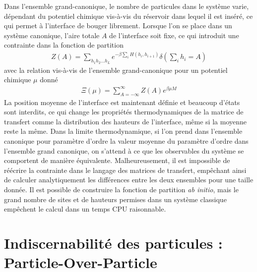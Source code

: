 Dans l'ensemble grand-canonique, le nombre de particules dans le système varie, dépendant du potentiel chimique vis-à-vis du réservoir dans lequel il est inséré, ce qui permet à l'interface de bouger librement. Lorsque l'on se place dans un système canonique, l'aire totale $A$ de l'interface soit fixe, ce qui introduit une contrainte dans la fonction de partition
\begin{align}
	 Z(A) = \sum_{h_1 h_2 ... h_L} e^{- \beta \sum_{i} H(h_i,h_{i+1})}  \delta(\sum_i h_i = A)
\end{align}
avec la relation vis-à-vis de l'ensemble grand-canonique pour un potentiel chimique $\mu$ donné
\begin{align}
	 \Xi(\mu) = \sum_{A = -\infty}^\infty Z(A) e^{\beta \mu M}
\end{align}
La position moyenne de l'interface est maintenant définie et beaucoup d'états sont interdits, ce qui change  les propriétés thermodynamiques de la matrice de transfert comme la distribution des hauteurs de l'interface, même si la moyenne reste la même. Dans la limite thermodynamique, si l'on prend dans l'ensemble canonique pour paramètre d'ordre la valeur moyenne du paramètre d'ordre dans l'ensemble grand canonique, on s'attend à ce que les observables du système se comportent de manière équivalente. 
Malheureusement, il est impossible de réécrire la contrainte dans le langage des matrices de transfert, empêchant ainsi de calculer analytiquement les différences entre les deux ensembles pour une taille donnée. Il est possible de construire la fonction de partition \textit{ab initio}, mais le grand nombre de sites et de hauteurs permises dans un système classique empêchent le calcul dans un temps CPU raisonnable. 


	\section{Indiscernabilité des particules : Particle-Over-Particle}
	
